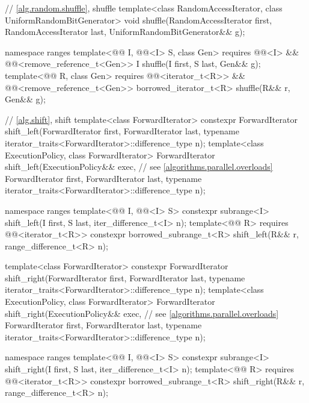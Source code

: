 \begin{codeblock}
{  // \ref{alg.random.shuffle}, shuffle
  template<class RandomAccessIterator, class UniformRandomBitGenerator>
    void shuffle(RandomAccessIterator first,
                 RandomAccessIterator last,
                 UniformRandomBitGenerator&& g);

  namespace ranges {
    template<@@ I, @@<I> S, class Gen>
      requires @@<I> &&
               @@<remove_reference_t<Gen>>
      I shuffle(I first, S last, Gen&& g);
    template<@@ R, class Gen>
      requires @@<iterator_t<R>> &&
               @@<remove_reference_t<Gen>>
      borrowed_iterator_t<R> shuffle(R&& r, Gen&& g);
  }

  // \ref{alg.shift}, shift
  template<class ForwardIterator>
    constexpr ForwardIterator
      shift_left(ForwardIterator first, ForwardIterator last,
                 typename iterator_traits<ForwardIterator>::difference_type n);
  template<class ExecutionPolicy, class ForwardIterator>
    ForwardIterator
      shift_left(ExecutionPolicy&& exec,                        // see \ref{algorithms.parallel.overloads}
                 ForwardIterator first, ForwardIterator last,
                 typename iterator_traits<ForwardIterator>::difference_type n);

  namespace ranges {
    template<@@ I, @@<I> S>
      constexpr subrange<I> shift_left(I first, S last, iter_difference_t<I> n);
    template<@@ R>
      requires @@<iterator_t<R>>
      constexpr borrowed_subrange_t<R> shift_left(R&& r, range_difference_t<R> n);
  }

  template<class ForwardIterator>
    constexpr ForwardIterator
      shift_right(ForwardIterator first, ForwardIterator last,
                  typename iterator_traits<ForwardIterator>::difference_type n);
  template<class ExecutionPolicy, class ForwardIterator>
    ForwardIterator
      shift_right(ExecutionPolicy&& exec,                       // see \ref{algorithms.parallel.overloads}
                  ForwardIterator first, ForwardIterator last,
                  typename iterator_traits<ForwardIterator>::difference_type n);

  namespace ranges {
    template<@@ I, @@<I> S>
      constexpr subrange<I> shift_right(I first, S last, iter_difference_t<I> n);
    template<@@ R>
      requires @@<iterator_t<R>>
      constexpr borrowed_subrange_t<R> shift_right(R&& r, range_difference_t<R> n);
  }

}
\end{codeblock}
